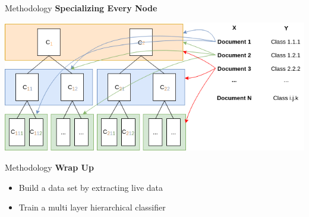 \begin{frame}[label=metho]{Methodology}
	\textbf{Specializing Every Node}
	
	\includegraphics[width=\textwidth]{images/distribution_3.png}
	
\end{frame}


\begin{frame}[label=metho]{Methodology}
	\textbf{Wrap Up}
	
	\begin{itemize}
		\item Build a data set by extracting live data
		\item Train a multi layer hierarchical classifier
	\end{itemize}
	
\end{frame}


